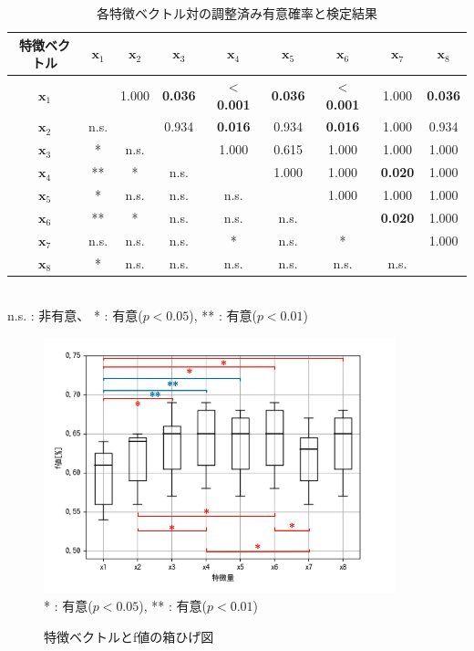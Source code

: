 \documentclass[titlepage,12pt]{jreport}
\begin{document}
\begin{table}[tbp]
	\begin{center}
		\caption{各特徴ベクトル対の調整済み有意確率と検定結果}
		\scalebox{0.85} {
			\begin{tabular}{|c||c|c|c|c|c|c|c|c|} \hline
				特徴ベクトル & $\bm{x}_1$ & $\bm{x}_2$ & $\bm{x}_3$ & $\bm{x}_4$ & $\bm{x}_5$ & $\bm{x}_6$ & $\bm{x}_7$ & $\bm{x}_8$ \\ \hline \hline
				$\bm{x}_1 $ &  & 1.000 & {\bf 0.036} & {\bf $<$ 0.001} & {\bf 0.036} & {\bf $<$ 0.001} & 1.000 & {\bf 0.036} \\ \hline
				$\bm{x}_2 $ & n.s. &  & 0.934 & {\bf 0.016} & 0.934 & {\bf 0.016} & 1.000 & 0.934 \\ \hline
				$\bm{x}_3 $ & * & n.s. &  & 1.000 & 0.615 & 1.000 & 1.000 & 1.000 \\ \hline
				$\bm{x}_4 $ & ** & * & n.s. &  & 1.000 & 1.000 & {\bf 0.020} & 1.000 \\ \hline
				$\bm{x}_5 $ & * & n.s. & n.s. & n.s. &  & 1.000 & 1.000 & 1.000 \\ \hline
				$\bm{x}_6 $ & ** & * & n.s. & n.s. & n.s. &  & {\bf 0.020} & 1.000 \\ \hline
				$\bm{x}_7 $ & n.s. & n.s. & n.s. & * & n.s. & * &  & 1.000 \\ \hline
				$\bm{x}_8 $ & * & n.s. & n.s. & n.s. & n.s. & n.s. & n.s. & \\ \hline
			\end{tabular}
		}
		\\n.s. : 非有意、 * : 有意($p < 0.05$), ** : 有意($p < 0.01$)
		\label{tab:feature-conc}
	\end{center}
\end{table}


\begin{figure}[htbp]
	\begin{center}
	\caption{特徴ベクトルとf値の箱ひげ図}
		\includegraphics[width = 102mm]{img/feature-hakohige2.png}
	\label{fig:hakohige}
	\\ * : 有意($p < 0.05$), ** : 有意($p < 0.01$)
	\end{center}
\end{figure}
\end{document}
